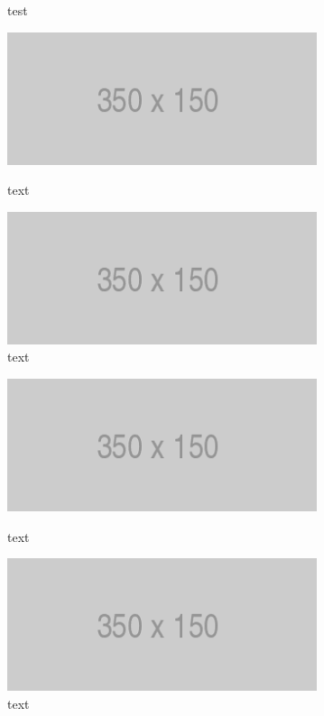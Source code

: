\documentclass[a4paper]{article}
\begin{document}
\begin{figure}[h]\scriptsize
\begin{sexylisting}{test}

\end{sexylisting}
\end{figure}

\begin{figure}[h]
	\centering
	\begin{minipage}{0.45\linewidth}
	\centering
	\includegraphics[scale=0.5]{placeholder}
	\caption{text}
	\end{minipage}
	\begin{minipage}{0.45\linewidth}
	\centering
	\includegraphics[scale=0.5]{placeholder}
	\caption{text}
	\end{minipage}
\end{figure}

\begin{figure}[h]
	\centering
	\begin{minipage}{0.45\linewidth}
	\centering
	\includegraphics[scale=0.5]{placeholder}
	\caption{text}
	\end{minipage}
	\begin{minipage}{0.45\linewidth}
	\centering
	\includegraphics[scale=0.5]{placeholder}
	\caption{text}
	\end{minipage}
\end{figure}
\end{document}
